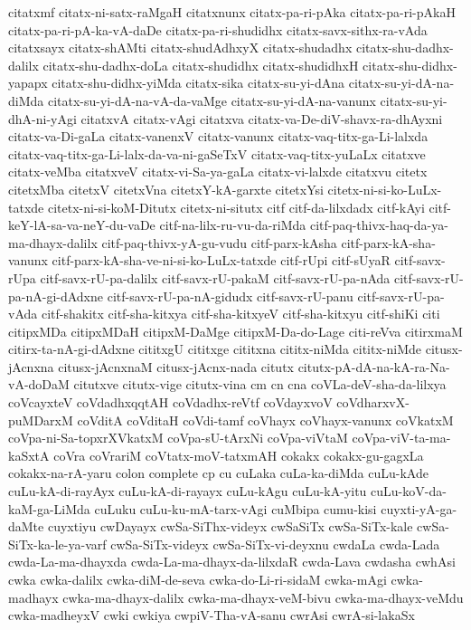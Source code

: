 {citatxmf
citatx-ni-satx-raMgaH
citatxnunx
citatx-pa-ri-pAka
citatx-pa-ri-pAkaH
citatx-pa-ri-pA-ka-vA-daDe
citatx-pa-ri-shudidhx
citatx-savx-sithx-ra-vAda
citatxsayx
citatx-shAMti
citatx-shudAdhxyX
citatx-shudadhx
citatx-shu-dadhx-dalilx
citatx-shu-dadhx-doLa
citatx-shudidhx
citatx-shudidhxH
citatx-shu-didhx-yapapx
citatx-shu-didhx-yiMda
citatx-sika
citatx-su-yi-dAna
citatx-su-yi-dA-na-diMda
citatx-su-yi-dA-na-vA-da-vaMge
citatx-su-yi-dA-na-vanunx
citatx-su-yi-dhA-ni-yAgi
citatxvA
citatx-vAgi
citatxva
citatx-va-De-diV-shavx-ra-dhAyxni
citatx-va-Di-gaLa
citatx-vanenxV
citatx-vanunx
citatx-vaq-titx-ga-Li-lalxda
citatx-vaq-titx-ga-Li-lalx-da-va-ni-gaSeTxV
citatx-vaq-titx-yuLaLx
citatxve
citatx-veMba
citatxveV
citatx-vi-Sa-ya-gaLa
citatx-vi-lalxde
citatxvu
citetx
citetxMba
citetxV
citetxVna
citetxY-kA-garxte
citetxYsi
citetx-ni-si-ko-LuLx-tatxde
citetx-ni-si-koM-Ditutx
citetx-ni-situtx
citf
citf-da-lilxdadx
citf-kAyi
citf-keY-lA-sa-va-neY-du-vaDe
citf-na-lilx-ru-vu-da-riMda
citf-paq-thivx-haq-da-ya-ma-dhayx-dalilx
citf-paq-thivx-yA-gu-vudu
citf-parx-kAsha
citf-parx-kA-sha-vanunx
citf-parx-kA-sha-ve-ni-si-ko-LuLx-tatxde
citf-rUpi
citf-sUyaR
citf-savx-rUpa
citf-savx-rU-pa-dalilx
citf-savx-rU-pakaM
citf-savx-rU-pa-nAda
citf-savx-rU-pa-nA-gi-dAdxne
citf-savx-rU-pa-nA-gidudx
citf-savx-rU-panu
citf-savx-rU-pa-vAda
citf-shakitx
citf-sha-kitxya
citf-sha-kitxyeV
citf-sha-kitxyu
citf-shiKi
citi
citipxMDa
citipxMDaH
citipxM-DaMge
citipxM-Da-do-Lage
citi-reVva
citirxmaM
citirx-ta-nA-gi-dAdxne
cititxgU
cititxge
cititxna
cititx-niMda
cititx-niMde
citusx-jAcnxna
citusx-jAcnxnaM
citusx-jAcnx-nada
citutx
citutx-pA-dA-na-kA-ra-Na-vA-doDaM
citutxve
citutx-vige
citutx-vina
cm
cn
cna
coVLa-deV-sha-da-lilxya
coVcayxteV
coVdadhxqqtAH
coVdadhx-reVtf
coVdayxvoV
coVdharxvX-puMDarxM
coVditA
coVditaH
coVdi-tamf
coVhayx
coVhayx-vanunx
coVkatxM
coVpa-ni-Sa-topxrXVkatxM
coVpa-sU-tArxNi
coVpa-viVtaM
coVpa-viV-ta-ma-kaSxtA
coVra
coVrariM
coVtatx-moV-tatxmAH
cokakx
cokakx-gu-gagxLa
cokakx-na-rA-yaru
colon
complete
cp
cu
cuLaka
cuLa-ka-diMda
cuLu-kAde
cuLu-kA-di-rayAyx
cuLu-kA-di-rayayx
cuLu-kAgu
cuLu-kA-yitu
cuLu-koV-da-kaM-ga-LiMda
cuLuku
cuLu-ku-mA-tarx-vAgi
cuMbipa
cumu-kisi
cuyxti-yA-ga-daMte
cuyxtiyu
cwDayayx
cwSa-SiThx-videyx
cwSaSiTx
cwSa-SiTx-kale
cwSa-SiTx-ka-le-ya-varf
cwSa-SiTx-videyx
cwSa-SiTx-vi-deyxnu
cwdaLa
cwda-Lada
cwda-La-ma-dhayxda
cwda-La-ma-dhayx-da-lilxdaR
cwda-Lava
cwdasha
cwhAsi
cwka
cwka-dalilx
cwka-diM-de-seva
cwka-do-Li-ri-sidaM
cwka-mAgi
cwka-madhayx
cwka-ma-dhayx-dalilx
cwka-ma-dhayx-veM-bivu
cwka-ma-dhayx-veMdu
cwka-madheyxV
cwki
cwkiya
cwpiV-Tha-vA-sanu
cwrAsi
cwrA-si-lakaSx
}
